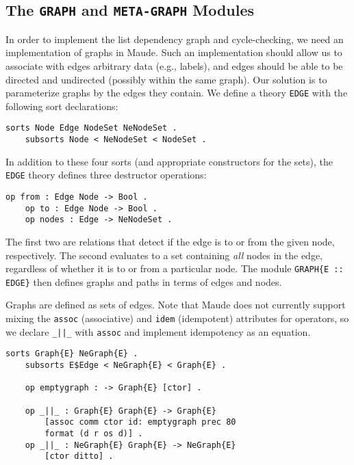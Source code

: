 \documentclass[11pt,twoside,titlepage]{article}
\newcommand{\TitleListing}[1]{\texorpdfstring{\lstinline|#1|}{#1}}
\begin{document}
\subsection{The \TitleListing{GRAPH} and \TitleListing{META-GRAPH} Modules}
\label{subsection:graph-mod}

In order to implement the list dependency graph and cycle-checking, we need an
implementation of graphs in Maude. Such an implementation should allow us to
associate with edges arbitrary data (e.g., labels), and edges should be able to
be directed and undirected (possibly within the same graph). Our solution is to
parameterize graphs by the edges they contain. We define a theory
\lstinline|EDGE| with the following sort declarations:
\begin{lstlisting}[language=Maude, style=smalllisting]
    sorts Node Edge NodeSet NeNodeSet .
    subsorts Node < NeNodeSet < NodeSet .
\end{lstlisting}
In addition to these four sorts (and appropriate constructors for the sets),
the \lstinline|EDGE| theory defines three destructor operations:
\begin{lstlisting}[language=Maude, style=smalllisting]
    op from : Edge Node -> Bool .
    op to : Edge Node -> Bool .
    op nodes : Edge -> NeNodeSet .
\end{lstlisting}

The first two are relations that detect if the edge is to or from the given
node, respectively. The second evaluates to a set containing \emph{al{}l} nodes
in the edge, regardless of whether it is to or from a particular node.  The
module \lstinline|GRAPH{E :: EDGE}| then defines graphs and paths in terms of
edges and nodes.

Graphs are defined as sets of edges. Note that Maude does not currently support
mixing the \lstinline|assoc| (associative) and \lstinline|idem| (idempotent)
attributes for operators, so we declare \lstinline!_||_! with \lstinline|assoc|
and implement idempotency as an equation.
\begin{lstlisting}[language=Maude, style=smalllisting]
    sorts Graph{E} NeGraph{E} .
    subsorts E$Edge < NeGraph{E} < Graph{E} .

    op emptygraph : -> Graph{E} [ctor] .

    op _||_ : Graph{E} Graph{E} -> Graph{E}
        [assoc comm ctor id: emptygraph prec 80
        format (d r os d)] .
    op _||_ : NeGraph{E} Graph{E} -> NeGraph{E}
        [ctor ditto] .
\end{lstlisting}
\end{document}
